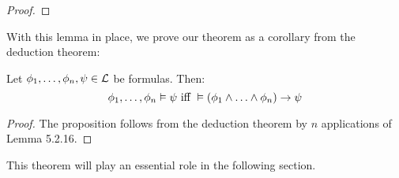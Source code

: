 \begin{enumerate}[\thesection.1]
\begin{proof}
		\end{proof}		
			
	With this lemma in place, we prove our theorem as a corollary from the deduction theorem:
	\begin{theorem}
	Let $\phi_1,\mathellipsis, \phi_n,\psi\in\mathcal{L}$ be formulas. Then:
	\[\phi_1,\mathellipsis, \phi_n\vDash \psi\text{ iff }\vDash (\phi_1\land\mathellipsis\land\phi_n)\to\psi\]
	\end{theorem}
	\begin{proof}
	The proposition follows from the deduction theorem by $n$ applications of Lemma 5.2.16.
	\end{proof}
	This theorem will play an essential role in the following section.
	

\end{enumerate}
